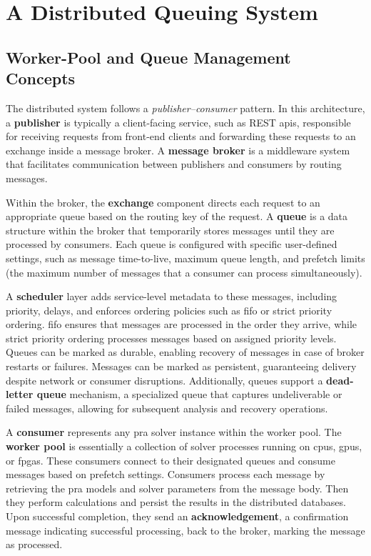 \chapter{A Distributed Queuing System}

\section{Worker-Pool and Queue Management Concepts}

The distributed system follows a \emph{publisher–consumer} pattern. In this architecture, a \textbf{publisher} is typically a client-facing service, such as REST \acrshort{api}s, responsible for receiving requests from front-end clients and forwarding these requests to an exchange inside a message broker. A \textbf{message broker} is a middleware system that facilitates communication between publishers and consumers by routing messages.

Within the broker, the \textbf{exchange} component directs each request to an appropriate queue based on the routing key of the request. A \textbf{queue} is a data structure within the broker that temporarily stores messages until they are processed by consumers. Each queue is configured with specific user-defined settings, such as message time-to-live, maximum queue length, and prefetch limits (the maximum number of messages that a consumer can process simultaneously).

A \textbf{scheduler} layer adds service-level metadata to these messages, including priority, delays, and enforces ordering policies such as \acrshort{fifo} or strict priority ordering. \acrshort{fifo} ensures that messages are processed in the order they arrive, while strict priority ordering processes messages based on assigned priority levels. Queues can be marked as durable, enabling recovery of messages in case of broker restarts or failures. Messages can be marked as persistent, guaranteeing delivery despite network or consumer disruptions. Additionally, queues support a \textbf{dead-letter queue} mechanism, a specialized queue that captures undeliverable or failed messages, allowing for subsequent analysis and recovery operations.

A \textbf{consumer} represents any \acrshort{pra} solver instance within the worker pool. The \textbf{worker pool} is essentially a collection of solver processes running on \acrshort{cpu}s, \acrshort{gpu}s, or \acrshort{fpga}s. These consumers connect to their designated queues and consume messages based on prefetch settings. Consumers process each message by retrieving the \acrshort{pra} models and solver parameters from the message body. Then they perform calculations and persist the results in the distributed databases. Upon successful completion, they send an \textbf{acknowledgement}, a confirmation message indicating successful processing, back to the broker, marking the message as processed.

